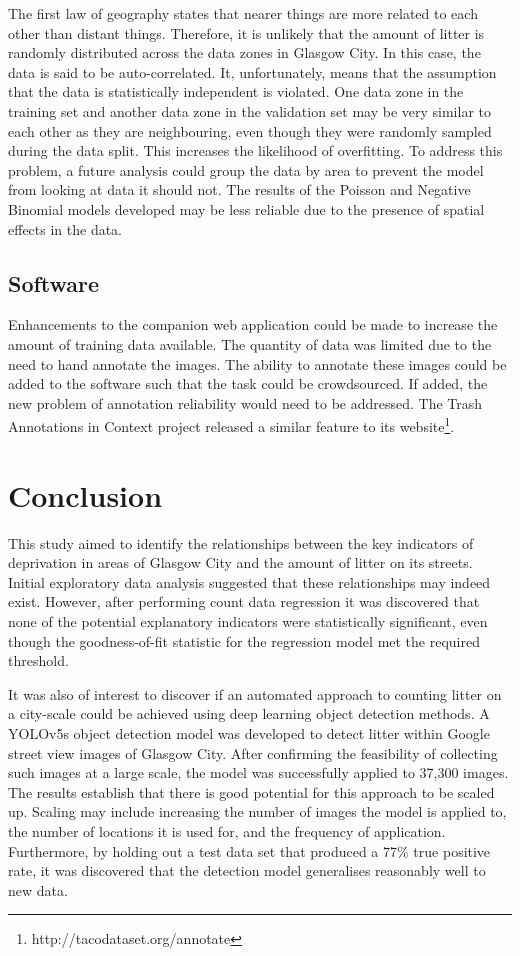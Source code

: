 \documentclass{thesis}
\begin{document}
The first law of geography states that nearer things are more related to each other than distant things\cite{law-geog-wikipedia}. Therefore, it is unlikely that the amount of litter is randomly distributed across the data zones in Glasgow City. In this case, the data is said to be auto-correlated. It, unfortunately, means that the assumption that the data is statistically independent is violated. One data zone in the training set and another data zone in the validation set may be very similar to each other as they are neighbouring, even though they were randomly sampled during the data split. This increases the likelihood of overfitting. To address this problem, a future analysis could group the data by area to prevent the model from looking at data it should not. The results of the Poisson and Negative Binomial models developed may be less reliable due to the presence of spatial effects in the data.

\subsection{Software}

Enhancements to the companion web application could be made to increase the amount of training data available. The quantity of data was limited due to the need to hand annotate the images. The ability to annotate these images could be added to the software such that the task could be crowdsourced. If added, the new problem of annotation reliability would need to be addressed. The Trash Annotations in Context project released a similar feature to its website\footnote{http://tacodataset.org/annotate}.

\section{Conclusion}

This study aimed to identify the relationships between the key indicators of deprivation in areas of Glasgow City and the amount of litter on its streets. Initial exploratory data analysis suggested that these relationships may indeed exist. However, after performing count data regression it was discovered that none of the potential explanatory indicators were statistically significant, even though the goodness-of-fit statistic for the regression model met the required threshold.

It was also of interest to discover if an automated approach to counting litter on a city-scale could be achieved using deep learning object detection methods. A YOLOv5s object detection model was developed to detect litter within Google street view images of Glasgow City. After confirming the feasibility of collecting such images at a large scale, the model was successfully applied to 37,300 images. The results establish that there is good potential for this approach to be scaled up. Scaling may include increasing the number of images the model is applied to, the number of locations it is used for, and the frequency of application. Furthermore, by holding out a test data set that produced a 77\% true positive rate, it was discovered that the detection model generalises reasonably well to new data.
\end{document}
